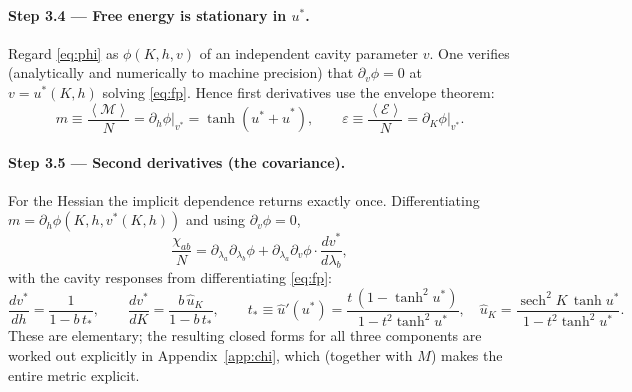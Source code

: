 \documentclass[11pt]{article}
\newcommand{\sech}{\operatorname{sech}}
\newcommand{\eq}{\mathcal{E}}
\newcommand{\mg}{\mathcal{M}}
\newcommand{\avg}[1]{\left\langle #1 \right\rangle}
\begin{document}
\paragraph{Step 3.4 --- Free energy is stationary in $u^*$.}
Regard \eqref{eq:phi} as $\phi(K,h,v)$ of an independent cavity parameter $v$. One verifies
(analytically and numerically to machine precision) that $\partial_v\phi=0$ at $v=u^*(K,h)$ solving
\eqref{eq:fp}. Hence first derivatives use the envelope theorem:
\begin{equation}
m\equiv\frac{\avg{\mg}}N=\partial_h\phi\big|_{v^*}=\tanh(u^*+\hat u^*),
\qquad
\varepsilon\equiv\frac{\avg{\eq}}N=\partial_K\phi\big|_{v^*}.
\end{equation}

\paragraph{Step 3.5 --- Second derivatives (the covariance).}
For the Hessian the implicit dependence returns exactly once. Differentiating
$m=\partial_h\phi(K,h,v^*(K,h))$ and using $\partial_v\phi=0$,
\begin{equation}
\frac{\chi_{ab}}N=\partial_{\lambda_a}\partial_{\lambda_b}\phi
+\partial_{\lambda_a}\partial_v\phi\cdot\frac{dv^*}{d\lambda_b},
\end{equation}
with the cavity responses from differentiating \eqref{eq:fp}:
\begin{equation}
\frac{dv^*}{dh}=\frac{1}{1-b\,t_*},\qquad
\frac{dv^*}{dK}=\frac{b\,\hat u_K}{1-b\,t_*},\qquad
t_*\equiv\hat u'(u^*)=\frac{t\,(1-\tanh^2u^*)}{1-t^2\tanh^2u^*},\quad
\hat u_K=\frac{\sech^2K\,\tanh u^*}{1-t^2\tanh^2u^*}.
\end{equation}
These are elementary; the resulting closed forms for all three components are worked out explicitly
in Appendix~\ref{app:chi}, which (together with $M$) makes the entire metric explicit.
\end{document}

